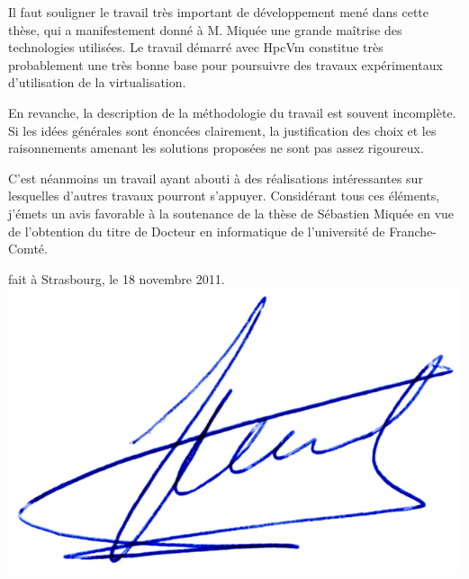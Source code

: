 \documentclass[a4paper,12pt]{article}
\begin{document}
Il faut souligner le travail très important de développement mené dans
cette thèse, qui a manifestement donné à  M. Miquée une grande maîtrise
des technologies utilisées. Le travail démarré avec HpcVm constitue très
probablement une très bonne base pour poursuivre des travaux expérimentaux
d'utilisation de la virtualisation.

En revanche, la description de la méthodologie du travail est souvent
incomplète. Si les idées générales sont énoncées clairement, la justification
des choix et les raisonnements amenant les solutions proposées ne sont
pas assez rigoureux. 

C'est néanmoins un travail ayant abouti à des réalisations intéressantes
sur lesquelles d'autres travaux pourront s'appuyer. Considérant tous ces 
éléments, j'émets un avis favorable à la soutenance de la thèse de Sébastien
Miquée en vue de l'obtention du titre de Docteur en informatique de 
l'université de Franche-Comté. 


\begin{flushright}

{\small fait à Strasbourg, le 18 novembre 2011}.\\
\includegraphics[width=.16\textwidth]{signgenaud.jpg}
\end{flushright}
\end{document}
